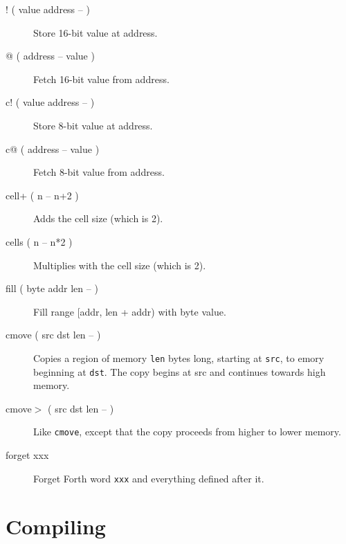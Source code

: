 \begin{description}
\item[! ( value address -- )] Store 16-bit value at address.  
\item[@ ( address -- value )] Fetch 16-bit value from address.  
\item[c! ( value address -- )] Store 8-bit value at address.  
\item[c@ ( address -- value )] Fetch 8-bit value from address.
\item[cell+ ( n -- n+2 )] Adds the cell size (which is 2).
\item[cells ( n -- n*2 )] Multiplies with the cell size (which is 2).
\item[fill ( byte addr len -- )] Fill range [addr, len + addr) with byte value.
\item[cmove ( src dst len -- )]
Copies a region of memory \texttt{len} bytes long, starting at \texttt{src}, to emory beginning at \texttt{dst}. The copy begins at src and continues towards high memory.
\item[cmove$>$ ( src dst len -- )]
Like \texttt{cmove}, except that the copy proceeds from higher to lower memory.
\item[forget xxx] Forget Forth word \texttt{xxx} and everything defined after it.

\end{description}
\section{Compiling}

